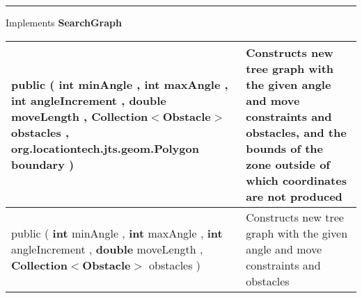 {\vspace*{4pt} \hrule \vspace*{3pt}
Implements \textbf{ SearchGraph }
\vspace*{-5pt} 
\begin{tabularx}{\linewidth}{X|m{}}
\label{tab:ConstrainedTreeGraph}
\begin{raggedleft}public  \textbf{\hyperref[tab:ConstrainedTreeGraph]{\color{blue}{ConstrainedTreeGraph}} }(\newline \hfill 
\hspace*{ 5pt} \textbf{int} minAngle , \newline
 \hspace*{ 5pt} \textbf{int} maxAngle , \newline
 \hspace*{ 5pt} \textbf{int} angleIncrement , \newline
 \hspace*{ 5pt} \textbf{double} moveLength , \newline
 \hspace*{ 5pt} \textbf{Collection$<$Obstacle$>$} obstacles , \newline
 \hspace*{ 5pt} \textbf{org.locationtech.jts.geom.Polygon} boundary  )
\end{raggedleft} &
 Constructs new tree graph with the given angle and move constraints and obstacles, and the bounds of the zone outside of which coordinates are not produced\\ \hline 
\begin{raggedleft}public  \textbf{\hyperref[tab:ConstrainedTreeGraph]{\color{blue}{ConstrainedTreeGraph}} }(\newline \hfill 
\hspace*{ 5pt} \textbf{int} minAngle , \newline
 \hspace*{ 5pt} \textbf{int} maxAngle , \newline
 \hspace*{ 5pt} \textbf{int} angleIncrement , \newline
 \hspace*{ 5pt} \textbf{double} moveLength , \newline
 \hspace*{ 5pt} \textbf{Collection$<$Obstacle$>$} obstacles  )
\end{raggedleft} &
 Constructs new tree graph with the given angle and move constraints and obstacles\\ \hline 

\end{tabularx}}

